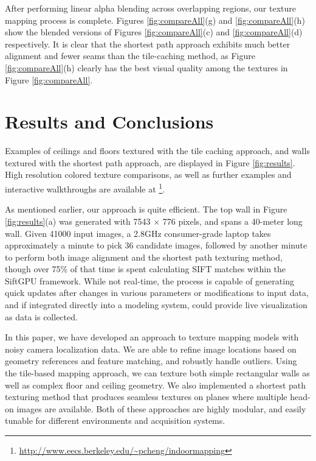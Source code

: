 \documentclass[]{spie}  %
\begin{document}
After performing linear alpha blending across overlapping regions, our
texture mapping process is complete. Figures \ref{fig:compareAll}(g)
and \ref{fig:compareAll}(h) show the blended versions of Figures
\ref{fig:compareAll}(c) and \ref{fig:compareAll}(d) respectively. It
is clear that the shortest path approach exhibits much better
alignment and fewer seams than the tile-caching method, as Figure
\ref{fig:compareAll}(h) clearly has the best visual quality among the
textures in Figure \ref{fig:compareAll}.

\section{Results and Conclusions}
\label{sec:resultsAndConclusions}
Examples of ceilings and floors textured with the tile caching
approach, and walls textured with the shortest path approach, are
displayed in Figure \ref{fig:results}. High resolution colored texture
comparisons, as well as further examples and interactive walkthroughs
are available at
\footnote{\url{http://www.eecs.berkeley.edu/~pcheng/indoormapping}}.

As mentioned earlier, our approach is quite efficient. The top wall in
Figure \ref{fig:results}(a) was generated with 7543 $\times$ 776
pixels, and spans a 40-meter long wall. Given 41000 input images, a
2.8GHz consumer-grade laptop takes approximately a minute to pick 36
candidate images, followed by another minute to perform both image
alignment and the shortest path texturing method, though over 75\% of
that time is spent calculating SIFT matches within the SiftGPU
framework. While not real-time, the process is capable of generating
quick updates after changes in various parameters or modifications to
input data, and if integrated directly into a modeling system, could
provide live visualization as data is collected.

In this paper, we have developed an approach to texture mapping models
with noisy camera localization data. We are able to refine image
locations based on geometry references and feature matching, and
robustly handle outliers. Using the tile-based mapping approach, we
can texture both simple rectangular walls as well as complex floor and
ceiling geometry. We also implemented a shortest path texturing method
that produces seamless textures on planes where multiple head-on
images are available. Both of these approaches are highly modular, and
easily tunable for different environments and acquisition systems.
\end{document}
